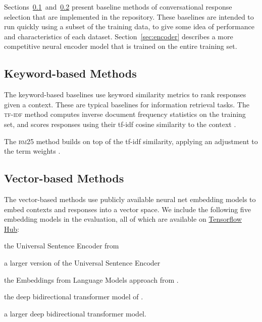 \documentclass[11pt,a4paper,table]{article}
\begin{document}
Sections~\ref{sec:keyword}~and~\ref{sec:vector} present baseline methods of conversational response selection that are implemented in the repository. These baselines are intended to run quickly using a subset of the training data, to give some idea of performance and characteristics of each dataset. Section~\ref{sec:encoder} describes a more competitive neural encoder model that is trained on the entire training set.

\subsection{Keyword-based Methods} \label{sec:keyword}

The keyword-based baselines use keyword similarity metrics to rank responses given a context. These are typical baselines for information retrieval tasks. The \textsc{tf-idf} method computes inverse document frequency statistics on the training set, and scores responses using their tf-idf cosine similarity to the context \cite{Manning:2008ir}.

The \textsc{bm25} method builds on top of the tf-idf similarity, applying an adjustment to the term weights \cite{Robertson:2009}.

\subsection{Vector-based Methods} \label{sec:vector}

The vector-based methods use publicly available neural net embedding models to embed contexts and responses into a vector space. We include the following five embedding models in the evaluation, all of which are available on \href{https://www.tensorflow.org/hub}{Tensorflow Hub}:

\begin{description}[itemindent=1mm]
  \setlength\itemsep{0.1em}
    \item[\textsc{use}] the Universal Sentence Encoder from 
    \item[\textsc{use-large}] a larger version of the Universal Sentence Encoder
    \item[\textsc{elmo}]  the Embeddings from Language Models approach from .
    \item[\textsc{bert-small}] the deep bidirectional transformer model of .
    \item[\textsc{bert-large}] a larger deep bidirectional transformer model.
\end{description}
\end{document}
